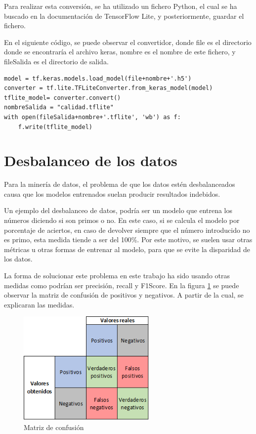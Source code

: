 Para realizar esta conversión, se ha utilizado un fichero Python, el cual se ha buscado en la documentación de TensorFlow Lite, y posteriormente, guardar el fichero. \cite{tensorflowliteConverter}

En el siguiente código, se puede observar el convertidor, donde file es el directorio donde se encontraría el archivo keras, nombre es el nombre de este fichero, y fileSalida es el directorio de salida.
\begin{lstlisting}
model = tf.keras.models.load_model(file+nombre+'.h5')
converter = tf.lite.TFLiteConverter.from_keras_model(model)
tflite_model= converter.convert()
nombreSalida = "calidad.tflite"
with open(fileSalida+nombre+'.tflite', 'wb') as f:
    f.write(tflite_model)

\end{lstlisting}
\section{Desbalanceo de los datos}

Para la minería de datos, el problema de que los datos estén desbalanceados causa que los modelos entrenados suelan producir resultados indebidos.

Un ejemplo del desbalanceo de datos, podría ser un modelo que entrena los números diciendo si son primos o no. En este caso, si se calcula el modelo por porcentaje de aciertos, en caso de devolver siempre que el número introducido no es primo, esta medida tiende a ser del 100\%.
Por este motivo, se suelen usar otras métricas u otras formas de entrenar al modelo, para que se evite la disparidad de los datos.

La forma de solucionar este problema en este trabajo ha sido usando otras medidas como podrían ser precisión, recall y F1Score.
En la figura \ref{fig:matrizDeConfusion} se puede observar la matriz de confusión de positivos y negativos. A partir de la cual, se explicaran las medidas.
\begin{figure}[!ht]
         \centering
         \includegraphics[width=0.6\textwidth]{img/Matriz de confusion.png}
          \caption{Matriz de confusión}
         \label{fig:matrizDeConfusion}
\end{figure}

